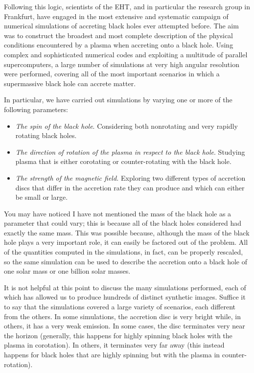 Following this logic, scientists of the EHT, and in particular the research group in
Frankfurt, have engaged in the most extensive and systematic campaign of numerical
simulations of accreting black holes ever attempted before. The aim was to construct the
broadest and most complete description of the physical conditions encountered by a
plasma when accreting onto a black hole. Using complex and sophisticated numerical codes
and exploiting a multitude of parallel supercomputers, a large number
of simulations at very high angular resolution were performed,
covering all of the most important scenarios in which a supermassive black hole can
accrete matter.

In particular, we have carried out simulations by varying one or more of the following
parameters:

\begin{itemize}
\item \emph{The spin of the black hole}. Considering both nonrotating and very rapidly
rotating black holes.

\item \emph{The direction of rotation of the plasma in respect to the black hole}. Studying
plasma that is either corotating or counter-rotating with the black hole.

\item \emph{The strength of the magnetic field.} Exploring two different types of accretion
discs that differ in the accretion rate they can produce and which can either be small
or large.
\end{itemize}

You may have noticed I have not mentioned the mass of the black hole as a parameter that
could vary; this is because all of the black holes considered had exactly the same mass.
This was possible because, although the mass of the black hole plays a very important
role, it can easily be factored out of the problem. All of the quantities computed in
the simulations, in fact, can be properly rescaled, so the same simulation can be used
to describe the accretion onto a black hole of one solar mass or one billion solar
masses.

It is not helpful at this point to discuss the many simulations performed, each of which
has allowed us to produce hundreds of distinct synthetic images.
Suffice it to say that the simulations covered a large variety of scenarios, each
different from the others. In some simulations, the accretion disc is very bright while,
in others, it has a very weak emission. In some cases, the disc terminates very near the
horizon (generally, this happens for highly spinning black holes with the plasma in
corotation). In others, it terminates very far away (this instead happens for black
holes that are highly spinning but with the plasma in counter-rotation).

